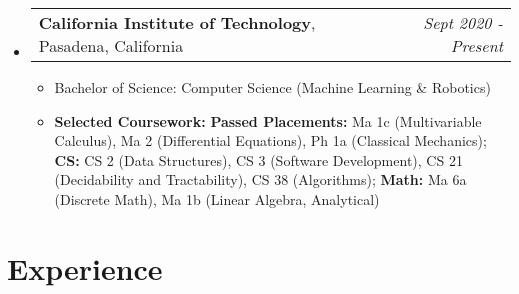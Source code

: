 \documentclass[letterpaper,11pt]{article}
\makeatletter
\newcommand{\resitem}[1]{\item #1 \vspace{-3pt}}
\newcommand{\edusubheading}[3]{
	\begin{tabular*}{7.0in}{l@{\extracolsep{\fill}}r}
		\textbf{#1}, #2 & \textit{#3} \\
\end{tabular*}\vspace{-6pt}}
\newcommand{\myitem}[1]{\item #1 \vspace{-9pt}}
\newcommand{\mysubitem}[1]{\item #1 \vspace{-4pt}}
\makeatother
\begin{document}
\begin{itemize}[leftmargin=*]
\item
	\edusubheading{California Institute of Technology}{Pasadena, California}{Sept 2020 - Present}
		\begin{itemize}
			\resitem{Bachelor of Science: Computer Science (Machine Learning \& Robotics)}
			\resitem{\textbf{Selected Coursework:} \textbf{Passed Placements:} Ma 1c (Multivariable Calculus), Ma 2 (Differential Equations), Ph 1a (Classical Mechanics); \textbf{CS:} CS 2 (Data Structures), CS 3 (Software Development), CS 21 (Decidability and Tractability), CS 38 (Algorithms); \textbf{Math:} Ma 6a (Discrete Math), Ma 1b (Linear Algebra, Analytical)}
		\end{itemize}
\end{itemize}



\section{Experience}
\end{document}
